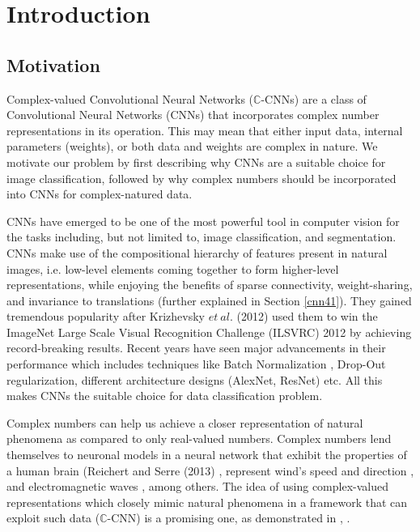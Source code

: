 \chapter{Introduction} \label{chap:intro}

\section{Motivation} \label{sect:moti}

Complex-valued Convolutional Neural Networks ($\mathbb{C}$-CNNs) are a class of Convolutional Neural Networks (CNNs) that incorporates complex number representations in its operation. This may mean that either input data, internal parameters (weights), or both data and weights are complex in nature. We motivate our problem by first describing why CNNs are a suitable choice for image classification, followed by why complex numbers should be incorporated into CNNs for complex-natured data.

CNNs have emerged to be one of the most powerful tool in computer vision for the tasks including, but not limited to, image classification, and segmentation. CNNs make use of the compositional hierarchy of features present in natural images, i.e. low-level elements coming together to form higher-level representations, while enjoying the benefits of sparse connectivity, weight-sharing, and invariance to translations (further explained in Section \ref{cnn41}).  They gained tremendous popularity after Krizhevsky $et \ al.$ (2012) \cite{krizhevsky2012imagenet} used them to win the ImageNet Large Scale Visual Recognition Challenge (ILSVRC) 2012 by achieving record-breaking results. Recent years have seen major advancements in their performance which includes techniques like Batch Normalization \cite{bnIoffeS15}, Drop-Out regularization, different architecture designs (AlexNet, ResNet) etc. All this makes CNNs the suitable choice for data classification problem.

Complex numbers can help us achieve a closer representation of natural phenomena as compared to only real-valued numbers. Complex numbers lend themselves to neuronal models in a neural network that exhibit the properties of a human brain (Reichert and Serre (2013) \cite{reichert2013neuronal}, represent wind's speed and direction \cite{wind}, and electromagnetic waves \cite{hirose2012complex}, among others. The idea of using complex-valued representations which closely mimic natural phenomena in a framework that can exploit such data ($\mathbb{C}$-CNN) is a promising one, as demonstrated in \cite{wind}, \cite{polsarzhang2017complex}.

